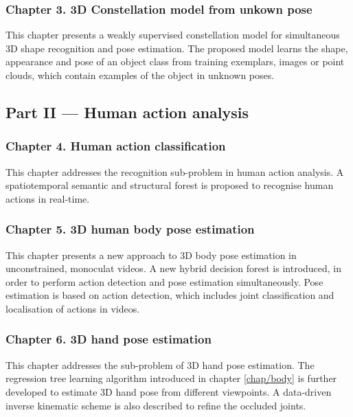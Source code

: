 \subsubsection*{Chapter 3. 3D Constellation model from unkown pose}
This chapter presents a weakly supervised constellation model for simultaneous 3D shape recognition and pose estimation. 
The proposed model learns the shape, appearance and pose of an object class from training exemplars, \eg images or point clouds, which contain examples of the object in unknown poses.  

\subsection*{Part II --- Human action analysis}


\subsubsection*{Chapter 4. Human action classification} 
This chapter addresses the recognition sub-problem in human action analysis. A spatiotemporal semantic and structural forest is proposed to recognise human actions in real-time.    

\subsubsection*{Chapter 5. 3D human body pose estimation} 
This chapter presents a new approach to 3D body pose estimation in unconstrained, monoculat videos. 
A new hybrid decision forest is introduced, in order to perform action detection and pose estimation simultaneously. 
Pose estimation is based on action detection, which includes joint classification and localisation of actions in videos. 

\subsubsection*{Chapter 6. 3D hand pose estimation} 
This chapter addresses the sub-problem of 3D hand pose estimation. 
The regression tree learning algorithm introduced in chapter \ref{chap/body} is further developed to estimate 3D hand pose from different viewpoints. 
A data-driven inverse kinematic scheme is also described to refine the occluded joints.
